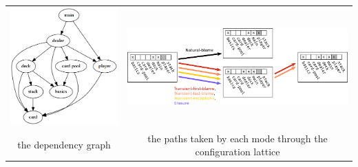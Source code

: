 {\begin{tabular}{l|ccl|ccl|cc|c}
\multicolumn{3}{c}{\begin{minipage}{0.25\textwidth}\centering\includegraphics[width=\linewidth]{Images/take5-module-graph}\end{minipage}} &
\multicolumn{7}{c}{\begin{minipage}{0.69\textwidth}\centering\includegraphics[width=\linewidth]{Images/trails-example}\end{minipage}} \\
\multicolumn{3}{c}{\begin{minipage}{0.25\textwidth}\centering the dependency graph\end{minipage}} &
\multicolumn{7}{c}{\begin{minipage}{0.69\textwidth}\centering the paths taken by each mode through the configuration lattice\end{minipage}} \\
\end{tabular}
\vspace{1em}

}
